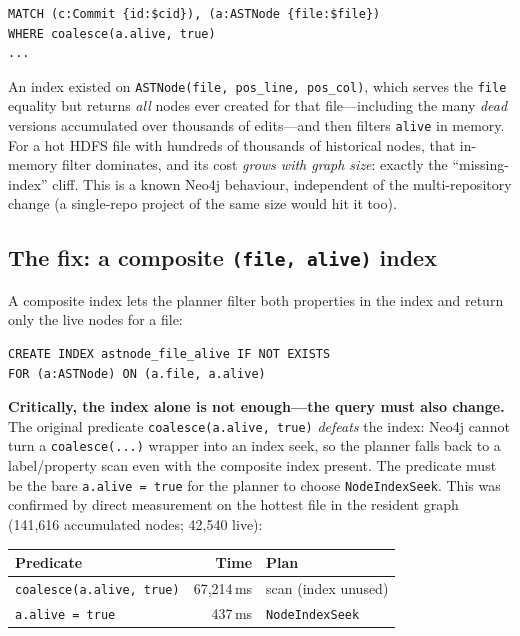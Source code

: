 \documentclass[11pt]{article}
\newcommand{\code}[1]{\texttt{#1}}
\begin{document}
\begin{lstlisting}
MATCH (c:Commit {id:$cid}), (a:ASTNode {file:$file})
WHERE coalesce(a.alive, true)
...
\end{lstlisting}

An index existed on \code{ASTNode(file, pos\_line, pos\_col)}, which serves the
\code{file} equality but returns \emph{all} nodes ever created for that
file---including the many \emph{dead} versions accumulated over thousands of
edits---and then filters \code{alive} in memory. For a hot HDFS file with
hundreds of thousands of historical nodes, that in-memory filter dominates, and
its cost \emph{grows with graph size}: exactly the ``missing-index'' cliff. This
is a known Neo4j behaviour, independent of the multi-repository change (a
single-repo project of the same size would hit it too).

\subsection{The fix: a composite \code{(file, alive)} index}
A composite index lets the planner filter both properties in the index and return
only the live nodes for a file:

\begin{lstlisting}
CREATE INDEX astnode_file_alive IF NOT EXISTS
FOR (a:ASTNode) ON (a.file, a.alive)
\end{lstlisting}

\textbf{Critically, the index alone is not enough---the query must also change.}
The original predicate \code{coalesce(a.alive, true)} \emph{defeats} the index:
Neo4j cannot turn a \code{coalesce(...)} wrapper into an index seek, so the
planner falls back to a label/property scan even with the composite index
present. The predicate must be the bare \code{a.alive = true} for the planner to
choose \code{NodeIndexSeek}. This was confirmed by direct measurement on the
hottest file in the resident graph (141{,}616 accumulated nodes; 42{,}540 live):

\begin{center}
\begin{tabular}{@{}lrl@{}}
\toprule
Predicate & Time & Plan \\
\midrule
\code{coalesce(a.alive, true)} & 67{,}214\,ms & scan (index unused) \\
\code{a.alive = true}          & 437\,ms     & \code{NodeIndexSeek} \\
\bottomrule
\end{tabular}
\end{center}
\end{document}
